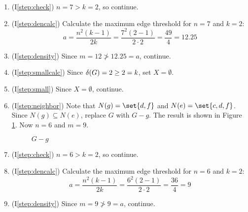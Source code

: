 \begin{enumerate}
\item (I\ref{step:check}) \(n=7>k=2\), so continue.

\item (I\ref{step:dencalc}) Calculate the maximum edge threshold for \(n=7\) and \(k=2\):
  \[a=\frac{n^2(k-1)}{2k}=\frac{7^2(2-1)}{2\cdot2}=\frac{49}{4}=12.25\]

\item (I\ref{step:density}) Since \(m=12\ngtr12.25=a\), continue.

\item (I\ref{step:smallcalc}) Since \(\delta(G)=2\ge2=k\), set \(X=\emptyset\).

\item (I\ref{step:small}) Since \(X=\emptyset\), continue.

\item (I\ref{step:neighbor}) Note that \(N(g)=\set{d,f}\) and \(N(e)=\set{c,d,f}\).  Since \(N(g)\subseteq N(e)\),
  replace \(G\) with \(G-g\).  The result is shown in Figure \ref{fig:removeg}.  Now \(n=6\) and \(m=9\).

  \begin{figure}[h]
    \label{fig:removeg}
    \begin{center}
    \end{center}
    \caption{\(G-g\)}
  \end{figure}

\item (I\ref{step:check}) \(n=6>k=2\), so continue.

\item (I\ref{step:dencalc}) Calculate the maximum edge threshold for \(n=6\) and \(k=2\):
  \[a=\frac{n^2(k-1)}{2k}=\frac{6^2(2-1)}{2\cdot2}=\frac{36}{4}=9\]

\item (I\ref{step:density}) Since \(m=9\ngtr9=a\), continue.


\end{enumerate}
